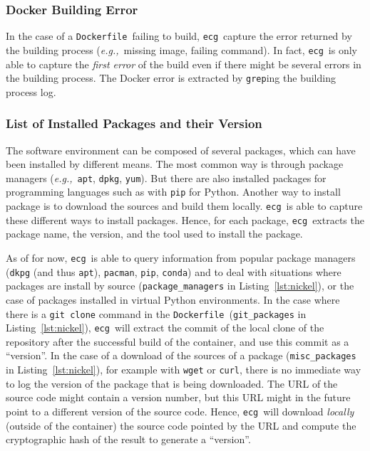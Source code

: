 \documentclass[sigconf,natbib=false]{acmart}
\newcommand{\eg}{\emph{e.g.,}}
\newcommand{\df}{\texttt{Dockerfile}}
\newcommand{\ecg}{\texttt{ecg}}
\begin{document}
\subsubsection{Docker Building Error}

In the case of a \df\ failing to build, \ecg\ capture the error returned by the building process (\eg\ missing image, failing command).
In fact, \ecg\ is only able to capture the \emph{first error} of the build even if there might be several errors in the building process.
The Docker error is extracted by \texttt{grep}ing the building process log.

\subsubsection{List of Installed Packages and their Version}

The software environment can be composed of several packages, which can have been installed by different means.
The most common way is through package managers (\eg\ \texttt{apt}, \texttt{dpkg}, \texttt{yum}).
But there are also installed packages for programming languages such as with \texttt{pip} for Python.
Another way to install package is to download the sources and build them locally.
\ecg\ is able to capture these different ways to install packages.
Hence, for each package, \ecg\ extracts the package name, the version, and the tool used to install the package.

As of for now, \ecg\ is able to query information from popular package managers (\texttt{dkpg} (and thus \texttt{apt}), \texttt{pacman}, \texttt{pip}, \texttt{conda}) and to deal with situations where packages are install by source (\texttt{package\_managers} in Listing~\ref{lst:nickel}), or the case of packages installed in virtual Python environments.
In the case where there is a \texttt{git clone} command in the \df\ (\texttt{git\_packages} in Listing~\ref{lst:nickel}), \ecg\ will extract the commit of the local clone of the repository after the successful build of the container, and use this commit as a ``version''.
In the case of a download of the sources of a package (\texttt{misc\_packages} in Listing~\ref{lst:nickel}), for example with \texttt{wget} or \texttt{curl}, there is no immediate way to log the version of the package that is being downloaded.
The URL of the source code might contain a version number, but this URL might in the future point to a different version of the source code.
Hence, \ecg\ will download \emph{locally} (outside of the container) the source code pointed by the URL and compute the cryptographic hash of the result to generate a ``version''.
\end{document}
